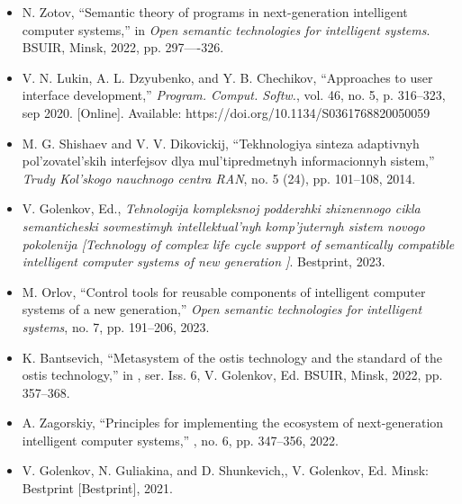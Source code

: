 \documentclass{article}
\begin{document}
\begin{multicols}{2}
\begin{itemize}
\renewcommand{\labelitemi}{ [7]}
\item  N. Zotov, “Semantic theory of programs in next-generation intelligent computer systems,” in \textit{Open semantic technologies for
intelligent systems}. BSUIR, Minsk, 2022, pp. 297—-326.

\renewcommand{\labelitemi}{ [8]}
\item V. N. Lukin, A. L. Dzyubenko, and Y. B. Chechikov,
“Approaches to user interface development,” \textit{Program. Comput.
Softw.}, vol. 46, no. 5, p. 316–323, sep 2020. [Online]. Available:
https://doi.org/10.1134/S0361768820050059

\renewcommand{\labelitemi}{ [9]}
\item M. G. Shishaev and V. V. Dikovickij, “Tekhnologiya sinteza
adaptivnyh pol’zovatel’skih interfejsov dlya mul’tipredmetnyh informacionnyh sistem,”\textit{ Trudy Kol’skogo nauchnogo centra RAN},
no. 5 (24), pp. 101–108, 2014.

\renewcommand{\labelitemi}{ [10]}
\item V. Golenkov, Ed., \textit{Tehnologija kompleksnoj podderzhki
zhiznennogo cikla semanticheski sovmestimyh intellektual’nyh
komp’juternyh sistem novogo pokolenija [Technology of complex
life cycle support of semantically compatible intelligent computer
systems of new generation ]}. Bestprint, 2023.

\renewcommand{\labelitemi}{ [11]}
\item M. Orlov, “Control tools for reusable components of intelligent
computer systems of a new generation,” \textit{Open semantic technologies for intelligent systems}, no. 7, pp. 191–206, 2023.

\renewcommand{\labelitemi}{ [12]}
\item K. Bantsevich, “Metasystem of the ostis technology and the
standard of the ostis technology,” in , ser. Iss. 6, V. Golenkov, Ed. BSUIR,
Minsk, 2022, pp. 357–368.

\renewcommand{\labelitemi}{ [13]}
\item A. Zagorskiy, “Principles for implementing the ecosystem of
next-generation intelligent computer systems,” , no. 6, pp. 347–356, 2022.

\renewcommand{\labelitemi}{ [14]}
\item V. Golenkov, N. Guliakina, and D. Shunkevich,, V. Golenkov,
Ed. Minsk: Bestprint [Bestprint], 2021.
\end{itemize}


\end{multicols}
\end{document}
